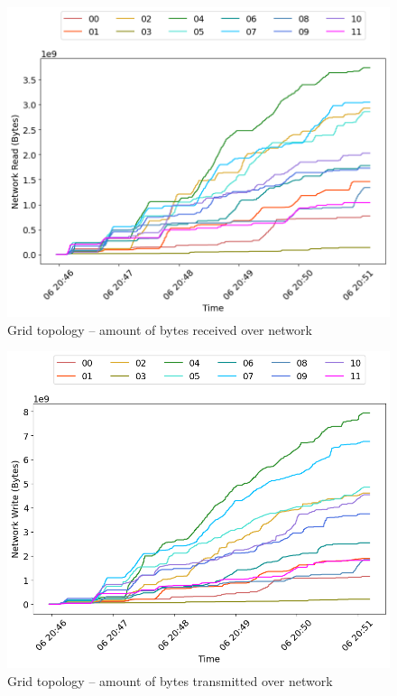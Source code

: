 \begin{minipage}{0.5\linewidth}
\begin{figure}[H]
\captionsetup{justification=centering,width=0.8\linewidth}
\includegraphics[width=\linewidth]{figures/grid/net_read.png}
\caption{Grid topology -- amount of bytes received over network}
\label{fig:grid-cpu_usage}
\end{figure}
\end{minipage}
\begin{minipage}{0.5\linewidth}
\begin{figure}[H]
\captionsetup{justification=centering,width=0.8\linewidth}
\includegraphics[width=\linewidth]{figures/grid/net_write.png}
\caption{Grid topology -- amount of bytes transmitted over network}
\label{fig:grid-mem_usage}
\end{figure}
\end{minipage}


